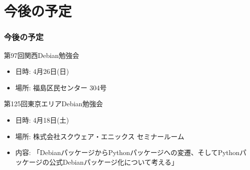 \documentclass[cjk,dvipdfmx,10pt,compress,%
hyperref={bookmarks=true,bookmarksnumbered=true,bookmarksopen=false,%
colorlinks=false,%
pdftitle={第 96 回 関西 Debian 勉強会},%
pdfauthor={倉敷・のがた・佐々木・かわだ},%
pdfsubject={資料},%
}]{beamer}
\begin{document}

\section{今後の予定}
\begin{frame}[fragile]
\frametitle{今後の予定}

\begin{block}{第97回関西Debian勉強会}
  \begin{itemize}
  \item 日時: 4月26日(日)
  \item 場所: 福島区民センター 304号
  \end{itemize}
\end{block}

\begin{block}{第125回東京エリアDebian勉強会}
  \begin{itemize}
  \item 日時: 4月18日(土)
  \item 場所: 株式会社スクウェア・エニックス セミナールーム
  \item 内容: 「DebianパッケージからPythonパッケージへの変遷、そしてPythonパッケージの公式Debianパッケージ化について考える」
  \end{itemize}
\end{block}

\end{frame}

\takahashi[50]{  }
\end{document}
